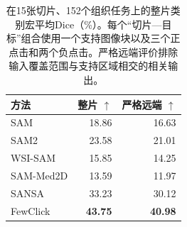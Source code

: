 \begin{table}[t]
\centering
\caption{在15张切片、152个组织任务上的整片类别宏平均Dice（\%）。每个“切片—目标”组合使用一个支持图像块以及三个正点击和两个负点击。严格远端评价排除输入覆盖范围与支持区域相交的相关输出。}
\label{tab:wsi}
\small
\setlength{\tabcolsep}{4pt}
\begin{tabular}{@{}lrr@{}}
\toprule
方法 & 整片 $\uparrow$ & 严格远端 $\uparrow$ \\
\midrule
SAM & 18.86 & 16.63 \\
SAM2 & 23.58 & 21.01 \\
WSI-SAM & 15.85 & 14.25 \\
SAM-Med2D & 13.59 & 11.97 \\
SANSA & 33.23 & 30.12 \\
FewClick & \textbf{43.75} & \textbf{40.98} \\
\bottomrule
\end{tabular}
\end{table}
